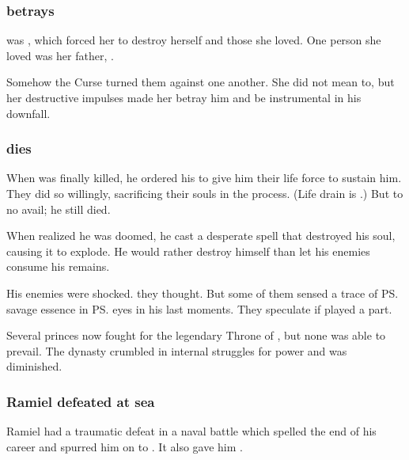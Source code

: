 \subsubsection{\Shiaraid{} betrays \Zachirah}
 was \NexagglachelsCurse, which forced her to destroy herself and those she loved. 
One person she loved was her father, \Zachirah. 

Somehow the Curse turned them against one another. 
She did not mean to, but her destructive impulses made her betray him and be instrumental in his downfall. 





\subsubsection{\Zachirah{} dies}
When \Zachirah{} was finally killed, he ordered his  to give him their life force to sustain him. 
They did so willingly, sacrificing their souls in the process. 
(Life drain is .)
But to no avail; he still died. 

When \Zachirah{} realized he was doomed, he cast a desperate spell that destroyed his soul, causing it to explode. 
He would rather destroy himself than let his enemies consume his remains. 

His enemies were shocked. 
 they thought. 
But some of them sensed a trace of \ps{\Nexagglachel} savage essence in \ps{\Zachirah} eyes in his last moments. 
They speculate if  played a part. 

Several princes now fought for the legendary Throne of \Mystraacht, but none was able to prevail. The dynasty crumbled in internal struggles for power and was diminished. 





\subsubsection{Ramiel defeated at sea}
Ramiel had a traumatic defeat in a naval battle which spelled the end of his career and spurred him on to . 
It also gave him . 

